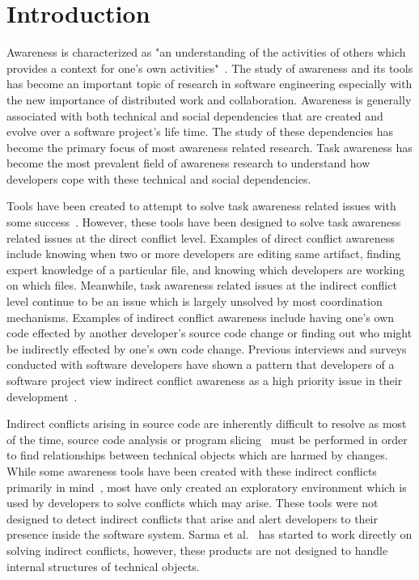 \documentclass[conference]{IEEEtran}
\begin{document}
\section{Introduction}
Awareness is characterized as "an understanding of the activities of others
which provides a context for one's own activities"~\cite{Dourish:1992:ACS}.
The study of awareness and its tools has become an important topic of
research in software engineering especially with the new importance of
distributed work and collaboration. Awareness is generally associated with
both technical and social dependencies that are created and evolve over
a software project's life time. The study of these dependencies has become
the primary focus of most awareness related research. Task awareness has
become the most prevalent field of awareness research to understand 
how developers cope with these technical and social dependencies.

Tools have been created to attempt to solve task awareness related issues
with some success~\cite{Xiang:2008:ERT, Biehl:2007:FVD, Sarma:2009:TIV, Khurana:2009:PFC}. However, these tools have been designed 
to solve task awareness related issues at the direct conflict level. 
Examples of direct conflict awareness include knowing when two or more 
developers are  editing same artifact, finding expert knowledge of a
particular file, and knowing which developers are working on which files.
Meanwhile, task awareness related issues at the indirect conflict level
continue to be an issue which is largely unsolved by most coordination
mechanisms. Examples of indirect conflict awareness
include having one's own code effected by another developer's source
code change or finding out who might be indirectly effected by one's
own code change. Previous interviews and surveys conducted with software developers have 
shown a pattern that developers of a software project view indirect conflict 
awareness  as a high priority issue in their development~\cite{Damian:2007:GSE, 
Halverson:2006:DTV, Begel:2010:CDE, Schroter:2012:TTF}.

Indirect conflicts arising in source code are inherently
difficult to resolve as most of the time, source code analysis or
program slicing~\cite{Weiser:1981:PS} must
be performed in order to find relationships between technical objects
which are harmed by changes.
While some awareness tools have been created with these indirect conflicts
primarily in mind~\cite{Begel:2010:CDE, Trainer:2005:BGT}, most have only 
created an exploratory environment which is used by developers to
solve conflicts which may arise. These tools were not designed to detect
indirect conflicts that arise and alert developers to their presence 
inside the software system. Sarma et al.~\cite{Sarma:2007:TSA} has started to work directly
on solving indirect conflicts, however, these products are not designed to handle
internal structures of technical objects.
\end{document}
